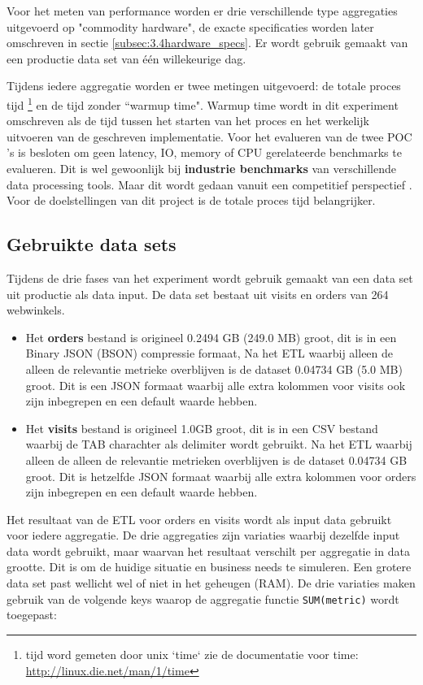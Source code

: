 Voor het meten van performance worden er drie verschillende type aggregaties uitgevoerd op "commodity hardware", de exacte specificaties worden later omschreven in sectie \ref{subsec:3.4hardware_specs}.  Er wordt gebruik gemaakt van een productie data set van één willekeurige dag.

Tijdens iedere aggregatie worden er twee metingen uitgevoerd: de totale proces tijd \footnote{tijd word gemeten door unix `time` zie de documentatie voor time: \url{http://linux.die.net/man/1/time}} en de  tijd zonder ``warmup time".  Warmup time wordt in dit experiment omschreven als de tijd tussen het starten van het proces en het werkelijk uitvoeren van de geschreven implementatie. Voor het evalueren van de twee POC 's is besloten om geen latency, IO, memory of CPU gerelateerde benchmarks te evalueren. Dit is wel gewoonlijk bij \textbf{industrie benchmarks} van verschillende data processing tools. Maar dit wordt gedaan vanuit een competitief perspectief  \parencite{ousterhout2015making}. Voor de doelstellingen van dit project is de totale proces tijd belangrijker.

\subsection{Gebruikte data sets}

Tijdens de drie fases van het experiment wordt gebruik gemaakt van een data set uit productie als data input. De data set bestaat uit visits en orders van 264 webwinkels.

\begin{itemize}
    \item Het \textbf{orders} bestand is origineel 0.2494 GB (249.0 MB) groot, dit is in een Binary JSON (BSON) compressie formaat, Na het ETL waarbij alleen de alleen de relevantie metrieke overblijven is de dataset 0.04734 GB (5.0 MB) groot. Dit is een JSON formaat waarbij alle extra kolommen voor visits ook zijn inbegrepen en een default waarde hebben.

    \item Het \textbf{visits} bestand is origineel 1.0GB groot, dit is in een CSV bestand waarbij de TAB charachter als delimiter wordt gebruikt.  Na het ETL waarbij alleen de alleen de relevantie metrieken overblijven is de dataset 0.04734 GB groot. Dit is hetzelfde JSON formaat waarbij alle extra kolommen voor orders zijn inbegrepen en een default waarde hebben.
\end{itemize}

Het resultaat van de ETL voor orders en visits wordt als input data gebruikt voor iedere aggregatie. De drie aggregaties zijn variaties waarbij dezelfde input data wordt gebruikt, maar waarvan het resultaat verschilt per aggregatie in data grootte. Dit is om de huidige situatie en business needs te simuleren. Een grotere data set past wellicht wel of niet in het geheugen (RAM). De drie variaties maken gebruik van de volgende keys waarop de aggregatie functie \verb=SUM(metric)= wordt toegepast:


